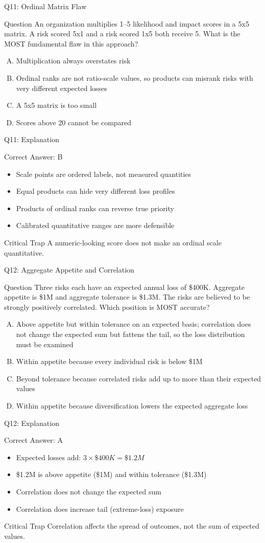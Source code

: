 \documentclass[aspectratio=169]{beamer}
\newcommand{\hq}[7]{%
	\begin{frame}{Q#1: #2}
		\begin{block}{Question}
			#3
		\end{block}
		\begin{enumerate}[(A)]
			#4
		\end{enumerate}
	\end{frame}
	\begin{frame}{Q#1: Explanation}
		\begin{block}{Correct Answer: #5}
			\begin{itemize}
				#6
			\end{itemize}
		\end{block}
		\begin{alertblock}{Critical Trap}
			#7
		\end{alertblock}
	\end{frame}
}
\begin{document}
	\hq{11}{Ordinal Matrix Flaw}
	{An organization multiplies 1--5 likelihood and impact scores in a 5x5 matrix. A risk scored 5x1 and a risk scored 1x5 both receive 5. What is the MOST fundamental flaw in this approach?}
	{\item Multiplication always overstates risk
		\item Ordinal ranks are not ratio-scale values, so products can misrank risks with very different expected losses
		\item A 5x5 matrix is too small
		\item Scores above 20 cannot be compared}
	{B}
	{\item Scale points are ordered labels, not measured quantities
		\item Equal products can hide very different loss profiles
		\item Products of ordinal ranks can reverse true priority
		\item Calibrated quantitative ranges are more defensible}
	{A numeric-looking score does not make an ordinal scale quantitative.}
	
	\hq{12}{Aggregate Appetite and Correlation}
	{Three risks each have an expected annual loss of \$400K. Aggregate appetite is \$1M and aggregate tolerance is \$1.3M. The risks are believed to be strongly positively correlated. Which position is MOST accurate?}
	{\item Above appetite but within tolerance on an expected basis; correlation does not change the expected sum but fattens the tail, so the loss distribution must be examined
		\item Within appetite because every individual risk is below \$1M
		\item Beyond tolerance because correlated risks add up to more than their expected values
		\item Within appetite because diversification lowers the expected aggregate loss}
	{A}
	{\item Expected losses add: $3 \times \$400K = \$1.2M$
		\item \$1.2M is above appetite (\$1M) and within tolerance (\$1.3M)
		\item Correlation does not change the expected sum
		\item Correlation does increase tail (extreme-loss) exposure}
	{Correlation affects the spread of outcomes, not the sum of expected values.}
	
\end{document}
